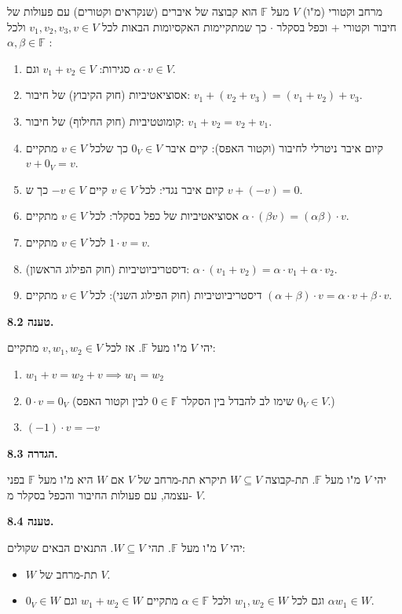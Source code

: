 \documentclass[12pt]{report}
\theoremstyle{plain}
\theoremstyle{definition}
\newcommand{\F}{\mathbb{F}}
\newcommand{\0}{\mathbf{0}}
\begin{document}
מרחב וקטורי (מ"ו)
$V$
מעל
$\F$
הוא קבוצה של איברים
(שנקראים וקטורים)
עם פעולות של חיבור וקטורי
$+$
וכפל בסקלר
$\cdot$
כך שמתקיימות האקסיומות הבאות לכל  
$v_1,v_2,v_3,v \in V $  
ולכל  
$ \alpha,\beta \in \F $  
:
\begin{enumerate}[label=\alph*.]
\item 
סגירות:
$v_1+v_2\in V$
וגם
$\alpha\cdot v\in V$.
\item
אסוציאטיביות (חוק הקיבוץ) של חיבור:  
$ v_1 + (v_2 + v_3) = (v_1 + v_2) + v_3 $.
\item
קומוטטיביות (חוק החילוף) של חיבור:  
$ v_1 + v_2 = v_2 + v_1 $.
\item
קיום איבר ניטרלי לחיבור (וקטור האפס): קיים איבר  
$0_V \in V$  
כך שלכל  
$v \in V$  
מתקיים  
$v + 0_V = v$.
\item
קיום איבר נגדי: לכל  
$v \in V$  
קיים  
$-v \in V $  
כך ש  
$v + (-v) = 0$.
\item
אסוציאטיביות של כפל בסקלר: 
לכל  
$v\in V $  
מתקיים
$\alpha\cdot(\beta v) = (\alpha\beta)\cdot v$.
\item   
לכל  
$v\in V$  
מתקיים 
$1\cdot v = v$.
\item 
דיסטריביוטיביות (חוק הפילוג הראשון):
$\alpha\cdot(v_1 + v_2) = \alpha\cdot v_1 + \alpha\cdot v_2$.
\item 
דיסטריביוטיביות (חוק הפילוג השני):
לכל  
$ v \in V $  
מתקיים
$(\alpha + \beta)\cdot v = \alpha\cdot v + \beta\cdot v$.
\end{enumerate}
\bigskip
\bigskip

\noindent\textbf{טענה 8.2.}

יהי
$V$
מ"ו מעל
$\F$.
אז לכל 
$v,w_1,w_2\in V$
מתקיים:
\begin{enumerate}[label=\alph*.]
\item 
$
w_1+v=w_2+v \implies w_1=w_2
$
\item 
$0\cdot v=0_V$
(שימו לב להבדל בין הסקלר
$0\in\F$
לבין וקטור האפס 
$0_V\in V$.)
\item 
$(-1)\cdot v=-v$
\end{enumerate}
\bigskip
\bigskip

\noindent\textbf{הגדרה 8.3.}

יהי 
$V$
מ"ו מעל
$\F$.
תת-קבוצה
$W\subseteq V$
תיקרא תת-מרחב של
$V$
אם
$W$
היא מ"ו מעל
$\F$
בפני עצמה,
עם פעולות החיבור והכפל בסקלר מ-
$V$.
\bigskip
\bigskip

\noindent\textbf{טענה 8.4.}

יהי
$V$
מ"ו מעל
$\F$.
תהי
$W\subseteq V$.
התנאים הבאים שקולים:
\begin{itemize}
\item 
$W$
תת-מרחב של
$V$.
\item 
$0_V\in W$
וגם לכל
$w_1,w_2\in W$
ולכל
$\alpha\in \F$
מתקיים
$w_1+w_2\in W$
וגם
$\alpha w_1\in W$.
\end{itemize}
\bigskip
\bigskip
\end{document}
